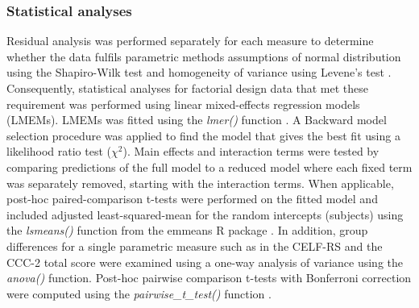 \documentclass[a4paper, twoside]{templates/ociamthesis}
\begin{document}
\hypertarget{statistical-analyses}{%
\subsubsection{Statistical analyses}\label{statistical-analyses}}

Residual analysis was performed separately for each measure to determine whether the data fulfils parametric methods assumptions of normal distribution using the Shapiro-Wilk test \autocite[\emph{shapiro.test()},][]{RCore} and homogeneity of variance using Levene's test \autocite[\emph{leveneTest()};][]{carPackageR}. Consequently, statistical analyses for factorial design data that met these requirement was performed using linear mixed-effects regression models (LMEMs). LMEMs was fitted using the \emph{lmer()} function \autocite[lme4 package;][]{lme4PackageR}. A Backward model selection procedure was applied to find the model that gives the best fit using a likelihood ratio test (\(\chi^2\)). Main effects and interaction terms were tested by comparing predictions of the full model to a reduced model where each fixed term was separately removed, starting with the interaction terms. When applicable, post-hoc paired-comparison t-tests were performed on the fitted model and included adjusted least-squared-mean for the random intercepts (subjects) using the \emph{lsmeans()} function from the emmeans R package \autocite{emmeansPackageR}. In addition, group differences for a single parametric measure such as in the CELF-RS and the CCC-2 total score were examined using a one-way analysis of variance using the \emph{anova()} function. Post-hoc pairwise comparison t-tests with Bonferroni correction were computed using the \emph{pairwise\_t\_test()} function \autocite[rstatix package;][]{rstatixPackageR}.\\
\end{document}
